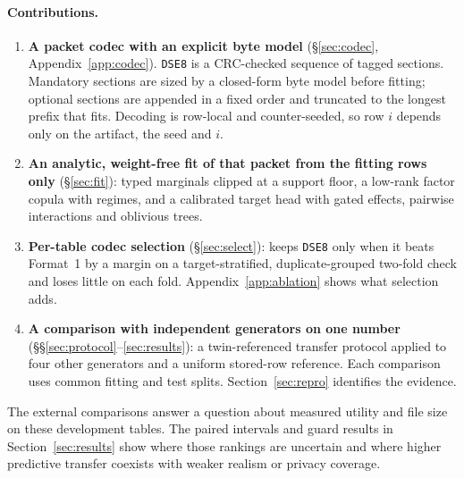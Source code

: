 \paragraph{Contributions.}
\begin{enumerate}
  \item \textbf{A packet codec with an explicit byte model} (\S\ref{sec:codec}, Appendix~\ref{app:codec}). \texttt{DSE8} is a CRC-checked sequence of tagged sections. Mandatory sections are sized by a closed-form byte model before fitting; optional sections are appended in a fixed order and truncated to the longest prefix that fits. Decoding is row-local and counter-seeded, so row $i$ depends only on the artifact, the seed and $i$.
  \item \textbf{An analytic, weight-free fit of that packet from the fitting rows only} (\S\ref{sec:fit}): typed marginals clipped at a support floor, a low-rank factor copula with regimes, and a calibrated target head with gated effects, pairwise interactions and oblivious trees.
  \item \textbf{Per-table codec selection} (\S\ref{sec:select}):  keeps \texttt{DSE8} only when it beats Format~1 by a margin on a target-stratified, duplicate-grouped two-fold check and loses little on each fold. Appendix~\ref{app:ablation} shows what selection adds.
  \item \textbf{A comparison with independent generators on one number} (\S\S\ref{sec:protocol}--\ref{sec:results}): a twin-referenced transfer protocol applied to four other generators and a uniform stored-row reference. Each comparison uses common fitting and test splits. Section~\ref{sec:repro} identifies the evidence.
\end{enumerate}

The external comparisons answer a question about measured utility and file size on these development tables. The paired intervals and guard results in Section~\ref{sec:results} show where those rankings are uncertain and where higher predictive transfer coexists with weaker realism or privacy coverage.
